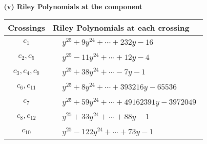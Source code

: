 \documentclass[1p]{elsarticle_modified}
\theoremstyle{definition}
\begin{document}
\newpage\renewcommand{\arraystretch}{1}
\flushleft \textbf{(v) Riley Polynomials at the component}\newline \\
\begin{tabular}{m{50pt}|m{274pt}}
Crossings & \hspace{64pt}Riley Polynomials at each crossing \\
\hline $$\begin{aligned}c_{1}\end{aligned}$$&$\begin{aligned}
&y^{25}+9 y^{24}+\cdots+232 y-16
\end{aligned}$\\
\hline $$\begin{aligned}c_{2},c_{5}\end{aligned}$$&$\begin{aligned}
&y^{25}-11 y^{24}+\cdots+12 y-4
\end{aligned}$\\
\hline $$\begin{aligned}c_{3},c_{4},c_{9}\end{aligned}$$&$\begin{aligned}
&y^{25}+38 y^{24}+\cdots-7 y-1
\end{aligned}$\\
\hline $$\begin{aligned}c_{6},c_{11}\end{aligned}$$&$\begin{aligned}
&y^{25}+8 y^{24}+\cdots+393216 y-65536
\end{aligned}$\\
\hline $$\begin{aligned}c_{7}\end{aligned}$$&$\begin{aligned}
&y^{25}+59 y^{24}+\cdots+49162391 y-3972049
\end{aligned}$\\
\hline $$\begin{aligned}c_{8},c_{12}\end{aligned}$$&$\begin{aligned}
&y^{25}+33 y^{24}+\cdots+88 y-1
\end{aligned}$\\
\hline $$\begin{aligned}c_{10}\end{aligned}$$&$\begin{aligned}
&y^{25}-122 y^{24}+\cdots+73 y-1
\end{aligned}$\\
\hline
\end{tabular}\\~\\
\end{document}
